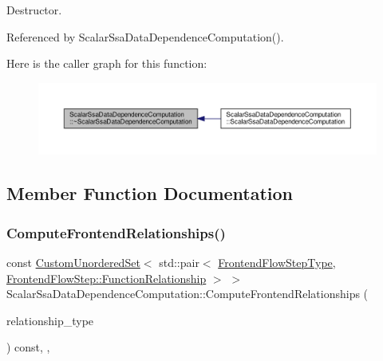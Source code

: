 Destructor. 



Referenced by Scalar\+Ssa\+Data\+Dependence\+Computation().

Here is the caller graph for this function\+:
\nopagebreak
\begin{figure}[H]
\begin{center}
\leavevmode
\includegraphics[width=350pt]{d7/d9e/classScalarSsaDataDependenceComputation_a56965ec861125f8789af1ac7d07c5b71_icgraph}
\end{center}
\end{figure}


\subsection{Member Function Documentation}
\mbox{\label{classScalarSsaDataDependenceComputation_ae75e90ee000e2b54738bb650d51ee07b}} 
\subsubsection{\texorpdfstring{Compute\+Frontend\+Relationships()}{ComputeFrontendRelationships()}}
{\footnotesize\ttfamily const \hyperlink{classCustomUnorderedSet}{Custom\+Unordered\+Set}$<$ std\+::pair$<$ \hyperlink{frontend__flow__step_8hpp_afeb3716c693d2b2e4ed3e6d04c3b63bb}{Frontend\+Flow\+Step\+Type}, \hyperlink{classFrontendFlowStep_af7cf30f2023e5b99e637dc2058289ab0}{Frontend\+Flow\+Step\+::\+Function\+Relationship} $>$ $>$ Scalar\+Ssa\+Data\+Dependence\+Computation\+::\+Compute\+Frontend\+Relationships (\begin{DoxyParamCaption}\item[{const \hyperlink{classDesignFlowStep_a723a3baf19ff2ceb77bc13e099d0b1b7}{Design\+Flow\+Step\+::\+Relationship\+Type}}]{relationship\+\_\+type }\end{DoxyParamCaption}) const\hspace{0.3cm}{\ttfamily [override]}, {\ttfamily [private]}, {\ttfamily [virtual]}}




